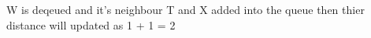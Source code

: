\documentclass[preview]{standalone}
\begin{document}
\begin{center}
W is deqeued and it's neighbour T and X added into the queue then thier distance will updated as 1 + 1 = 2
\end{center}
\end{document}
